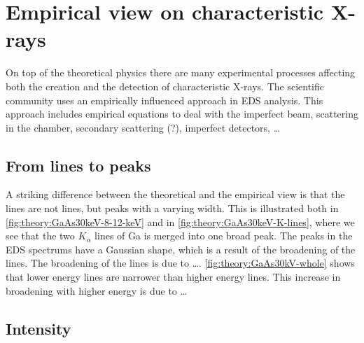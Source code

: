 




%
%
%
%
\section{Empirical view on characteristic X-rays}
\label{sec:theory:empirical}
On top of the theoretical physics there are many experimental processes affecting both the creation and the detection of characteristic X-rays.
The scientific community uses an empirically influenced approach in EDS analysis.
This approach includes empirical equations to deal with the imperfect beam, scattering in the chamber, secondary scattering (?), imperfect detectors, \dots


%
%
\subsection{From lines to peaks}
\label{sec:theory:empirical:peaks}
A striking difference between the theoretical and the empirical view is that the lines are not lines, but peaks with a varying width.
This is illustrated both in \cref{fig:theory:GaAs30keV-8-12-keV} and in \cref{fig:theory:GaAs30keV-K-lines}, where we see that the two $K_\alpha$ lines of Ga is merged into one broad peak.
The peaks in the EDS spectrums have a Gaussian shape, which is a result of the broadening of the lines.
The broadening of the lines is due to \dots {}.
\cref{fig:theory:GaAs30kV-whole} shows that lower energy lines are narrower than higher energy lines.
This increase in broadening with higher energy is due to \dots {}


%
% 
\subsection{Intensity}
\label{sec:theory:empirical:intensity}


